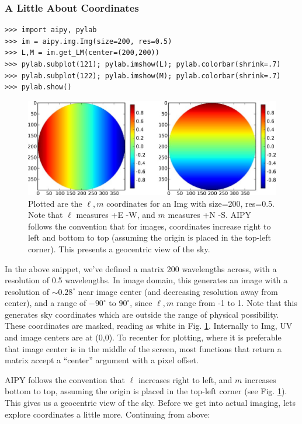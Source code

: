 \subsubsection{A Little About Coordinates}

\begin{verbatim}
>>> import aipy, pylab
>>> im = aipy.img.Img(size=200, res=0.5)
>>> L,M = im.get_LM(center=(200,200))
>>> pylab.subplot(121); pylab.imshow(L); pylab.colorbar(shrink=.7)
>>> pylab.subplot(122); pylab.imshow(M); pylab.colorbar(shrink=.7)
>>> pylab.show()
\end{verbatim}

\begin{figure}
\begin{center}
\includegraphics[scale=.4]{img_lm.jpg}
\caption{Plotted are the $\ell,m$ coordinates for an Img with size=200,
res=0.5.  Note that $\ell$ measures +E -W, and $m$ measures +N -S.  AIPY
follows the convention that for images, coordinates increase right to left
and bottom to top (assuming the origin is placed in the top-left corner).  
This presents a geocentric view of the sky.}
\label{fig:img_lm}
\end{center}
\end{figure}

In the above snippet, we've defined a matrix 200 wavelengths across, with a
resolution of 0.5 wavelengths.  In image domain, this generates an image with
a resolution of $\sim0.28^\circ$ near image center (and decreasing resolution
away from center), and a range of $-90^\circ$ to $90^\circ$, since $\ell,m$
range from -1 to 1.  Note that this generates sky coordinates which are
outside the range of physical possibility.  These coordinates are masked,
reading as white in Fig. \ref{fig:img_lm}.  Internally to Img, UV and image
centers are at (0,0).  To recenter for plotting, where it is preferable that
image center is in the middle of the screen, most functions that return a
matrix accept a ``center'' argument with a pixel offset.

AIPY follows the convention that $\ell$ increases right to left, and $m$
increases bottom to top, assuming the origin is placed in the top-left corner
(see Fig. \ref{fig:img_lm}).  This gives us a geocentric view of the sky.
Before we get into actual imaging, lets explore coordinates a little more.
Continuing from above:

